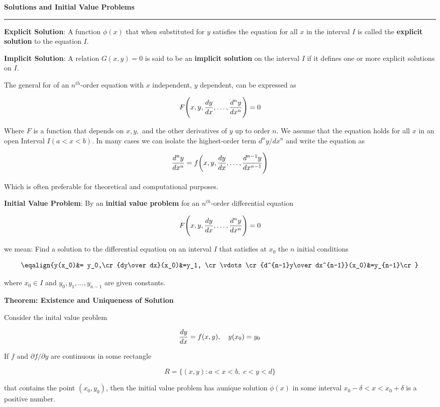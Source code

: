 \nopagenumbers
{\bf Solutions and Initial Value Problems}
\vskip 1mm
\hrule

\vskip 6pt
{\bf Explicit Solution}: A function $\phi(x)$ that when substituted for $y$ satisfies the equation for all $x$ in the interval $I$ is called the {\bf explicit solution} to the equation $I$.

\vskip 6pt
{\bf Implicit Solution}: A relation $G(x,y)=0$ is said to be an {\bf implicit solution} on the interval $I$ if it defines one or more explicit solutions on $I$.

\vskip 6pt
The general for of an $n^{th}$-order equation with $x$ independent, $y$ dependent, can be expressed as

$$F\Biggl(x,y,{dy\over dx},\ldots, {d^ny\over dx^n}\Biggr)=0$$

\vskip 6pt
Where $F$ is a function that depends on $x,y,$ and the other derivatives of $y$ up to order $n$. We assume that the equation holds for all $x$ in an open Interval $I(a<x<b)$. In many cases we can isolate the highest-order term $d^ny/dx^n$ and write the equation as

$${d^ny\over dx^n}=f\biggl(x,y,{dy\over dx},\ldots,{d^{n-1}y\over dx^{n-1}}\Biggr)$$

\vskip 6pt
Which is often preferable for theoretical and computational purposes.

\vskip 6pt
{\bf Initial Value Problem}: By an {\bf initial value problem} for an $n^{th}$-order differential equation

$$F\Biggl(x,y,{dy\over dx},\ldots, {d^ny\over dx^n}\Biggr)=0$$

we mean: Find a solution to the differential equation on an interval $I$ that satisfies at $x_0$ the $n$ initial conditions

$$\eqalign{y(x_0)&= y_0,\cr
	{dy\over dx}(x_0)&=y_1, \cr
	\vdots\cr
	{d^{n-1}y\over dx^{n-1}}(x_0)&=y_{n-1}\cr}$$

where $x_0 \in I$ and $y_0, y_1,\ldots, y_{n-1}$ are given constants.

\vskip 6pt
{\bf Theorem: Existence and Uniqueness of Solution}

\vskip 6pt
Consider the inital value problem

$${dy\over dx}=f(x,y),\quad y(x_0)=y_0$$

If $f$ and $\partial f/ \partial y$ are continuous in some rectangle

$$R=\lbrace(x,y): a<x<b,\;c<y<d\rbrace$$

that contains the point $(x_0,y_0)$, then the initial value problem has aunique solution $\phi(x)$ in some interval $x_0-\delta<x<x_0+\delta$ is a positive number.


\vfill\eject
\bye

